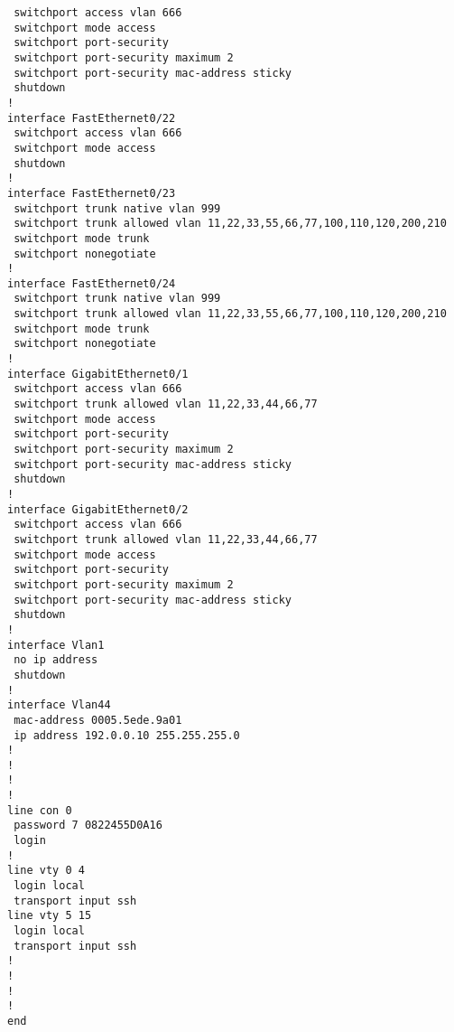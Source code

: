 \begin{verbatim}
 switchport access vlan 666
 switchport mode access
 switchport port-security
 switchport port-security maximum 2
 switchport port-security mac-address sticky 
 shutdown
!
interface FastEthernet0/22
 switchport access vlan 666
 switchport mode access
 shutdown
!
interface FastEthernet0/23
 switchport trunk native vlan 999
 switchport trunk allowed vlan 11,22,33,55,66,77,100,110,120,200,210
 switchport mode trunk
 switchport nonegotiate
!
interface FastEthernet0/24
 switchport trunk native vlan 999
 switchport trunk allowed vlan 11,22,33,55,66,77,100,110,120,200,210
 switchport mode trunk
 switchport nonegotiate
!
interface GigabitEthernet0/1
 switchport access vlan 666
 switchport trunk allowed vlan 11,22,33,44,66,77
 switchport mode access
 switchport port-security
 switchport port-security maximum 2
 switchport port-security mac-address sticky 
 shutdown
!
interface GigabitEthernet0/2
 switchport access vlan 666
 switchport trunk allowed vlan 11,22,33,44,66,77
 switchport mode access
 switchport port-security
 switchport port-security maximum 2
 switchport port-security mac-address sticky 
 shutdown
!
interface Vlan1
 no ip address
 shutdown
!
interface Vlan44
 mac-address 0005.5ede.9a01
 ip address 192.0.0.10 255.255.255.0
!
!
!
!
line con 0
 password 7 0822455D0A16
 login
!
line vty 0 4
 login local
 transport input ssh
line vty 5 15
 login local
 transport input ssh
!
!
!
!
end
\end{verbatim}


\clearpage
